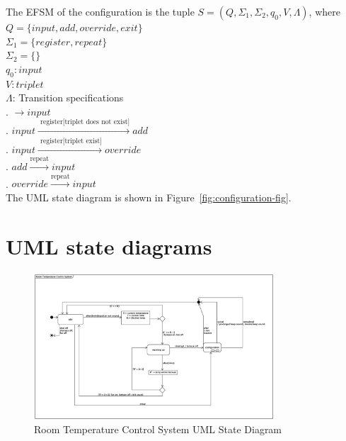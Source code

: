 \documentclass[12pt]{article}
\begin{document}
\begin{spacing}{1.5}
\noindent The EFSM of the configuration is the tuple $S = (Q, \Sigma_1, \Sigma_2, q_0, V, \Lambda)$, where\\
\noindent $Q = \{input, add, override, exit\}$\\
\noindent $\Sigma_1 = \{register, repeat\}$\\
\noindent $\Sigma_2 = \{\}$\\
\noindent $q_0: input$\\
\noindent $V: triplet$\\
\noindent $\Lambda$: Transition specifications\\
. $\rightarrow input$\\
. $input \xrightarrow {\text { register[triplet does not exist]}} add$\\
. $input \xrightarrow {\text { register[triplet exist]}} override$\\
. $add \xrightarrow {\text {repeat}} input$\\
. $override \xrightarrow {\text {repeat}} input$\\

\noindent The UML state diagram is shown in Figure~\ref{fig:configuration-fig}.

\newpage

\section{UML state diagrams}

\begin{figure}[h!]
	\centering
		\includegraphics[width=0.8\textwidth]{./figures/eps/SystemEFSM.eps}
		  \caption{Room Temperature Control System UML State Diagram}
  \label{fig:system-fig}
\end{figure}


\end{spacing}
\end{document}
